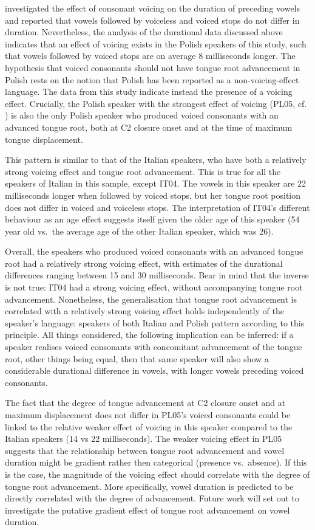 \documentclass[authoryear, twocolumn]{elsarticle}
\begin{document}
\citet{keating1984} investigated the effect of consonant voicing on the
duration of preceding vowels and reported that vowels followed by
voiceless and voiced stops do not differ in duration. Nevertheless, the
analysis of the durational data discussed above indicates that an effect
of voicing exists in the Polish speakers of this study, such that vowels
followed by voiced stops are on average 8 milliseconds longer. The
hypothesis that voiced consonants should not have tongue root
advancement in Polish rests on the notion that Polish has been reported
as a non-voicing-effect language. The data from this study indicate
instead the presence of a voicing effect. Crucially, the Polish speaker
with the strongest effect of voicing (PL05, cf. )
is also the only Polish speaker who produced voiced consonants with an
advanced tongue root, both at C2 closure onset and at the time of
maximum tongue displacement.

This pattern is similar to that of the Italian speakers, who have both a
relatively strong voicing effect and tongue root advancement. This is
true for all the speakers of Italian in this sample, except IT04. The
vowels in this speaker are 22 milliseconds longer when followed by
voiced stops, but her tongue root position does not differ in voiced and
voiceless stops. The interpretation of IT04's different behaviour as an
age effect suggests itself given the older age of this speaker (54 year
old vs.~the average age of the other Italian speaker, which was 26).

Overall, the speakers who produced voiced consonants with an advanced
tongue root had a relatively strong voicing effect, with estimates of
the durational differences ranging between 15 and 30 milliseconds. Bear
in mind that the inverse is not true: IT04 had a strong voicing effect,
without accompanying tongue root advancement. Nonetheless, the
generalisation that tongue root advancement is correlated with a
relatively strong voicing effect holds independently of the speaker's
language: speakers of both Italian and Polish pattern according to this
principle. All things considered, the following implication can be
inferred: if a speaker realises voiced consonants with concomitant
advancement of the tongue root, other things being equal, then that same
speaker will also show a considerable durational difference in vowels,
with longer vowels preceding voiced consonants.

The fact that the degree of tongue advancement at C2 closure onset and
at maximum displacement does not differ in PL05's voiced consonants
could be linked to the relative weaker effect of voicing in this speaker
compared to the Italian speakers (14 vs 22 milliseconds). The weaker
voicing effect in PL05 suggests that the relationship between tongue
root advancement and vowel duration might be gradient rather then
categorical (presence vs.~absence). If this is the case, the magnitude
of the voicing effect should correlate with the degree of tongue root
advancement. More specifically, vowel duration is predicted to be
directly correlated with the degree of advancement. Future work will set
out to investigate the putative gradient effect of tongue root
advancement on vowel duration.
\end{document}

